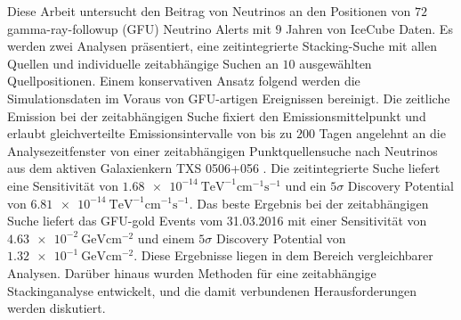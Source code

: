 Diese Arbeit untersucht den Beitrag von Neutrinos an den Positionen von $\num{72}$ gamma-ray-followup (GFU) Neutrino Alerts mit $\num{9}$ Jahren von IceCube Daten.
Es werden zwei Analysen präsentiert, eine zeitintegrierte Stacking-Suche mit allen Quellen und individuelle zeitabhängige Suchen an $\num{10}$ ausgewählten Quellpositionen.
Einem konservativen Ansatz folgend werden die Simulationsdaten im Voraus von GFU-artigen Ereignissen bereinigt.
Die zeitliche Emission bei der zeitabhängigen Suche fixiert den Emissionsmittelpunkt und erlaubt gleichverteilte Emissionsintervalle von bis zu $\num{200}$ Tagen angelehnt an die Analysezeitfenster von einer zeitabhängigen Punktquellensuche nach Neutrinos aus dem aktiven Galaxienkern TXS 0506+056 \cite{_txs}.
Die zeitintegrierte Suche liefert eine Sensitivität von $\SI{1.68e-14}{\tera\electronvolt\tothe{-1}\centi\meter\tothe{-1}\second\tothe{-1}}$ und ein $\num{5}\sigma$ Discovery Potential von $\SI{6.81e-14}{\tera\electronvolt\tothe{-1}\centi\meter\tothe{-1}\second\tothe{-1}}$.
Das beste Ergebnis bei der zeitabhängigen Suche liefert das GFU-gold Events vom 31.03.2016 mit einer Sensitivität von $\SI{4.63e-2}{\giga\electronvolt\centi\meter\tothe{-2}}$ und einem $\num{5}\sigma$ Discovery Potential von $\SI{1.32e-1}{\giga\electronvolt\centi\meter\tothe{-2}}$.
Diese Ergebnisse liegen in dem Bereich vergleichbarer Analysen.
Darüber hinaus wurden Methoden für eine zeitabhängige Stackinganalyse entwickelt, und die damit verbundenen Herausforderungen werden diskutiert.
